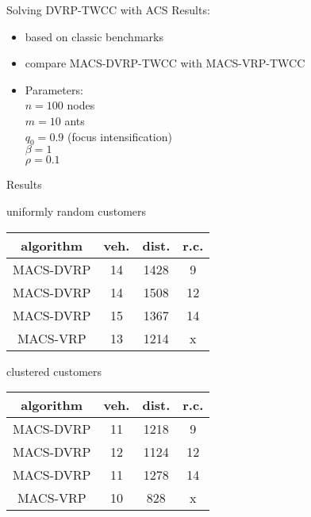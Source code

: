 \begin{frame}{Solving DVRP-TWCC with ACS}
  Results:
  \begin{itemize}
    \item based on classic benchmarks
    \item compare MACS-DVRP-TWCC with MACS-VRP-TWCC
    \item Parameters: \\
	  $n=100$ nodes\\
	  $m=10$ ants\\
	  $q_0=0.9$ (focus intensification)\\
	  $\beta = 1$\\
	  $\rho = 0.1$\\
    
  \end{itemize}
\end{frame}
\begin{frame}{Results}
  \begin{center}

  uniformly random customers\\
  \begin{tabular}{|c|c|c|c|}
    \hline
    algorithm	& veh.	& dist.	& r.c.	\\
    \hline
    MACS-DVRP	& 14	& 1428	& 9	\\
    MACS-DVRP	& 14	& 1508	& 12	\\
    MACS-DVRP	& 15	& 1367	& 14	\\
    \hline
    MACS-VRP	& 13	& 1214	& x	\\
    \hline
  \end{tabular}
  
  \vspace{15pt}

  clustered customers\\
  \begin{tabular}{|c|c|c|c|}
    \hline
    algorithm	& veh.	& dist.	& r.c.	\\
    \hline
    MACS-DVRP	& 11	& 1218	& 9	\\
    MACS-DVRP	& 12	& 1124	& 12	\\
    MACS-DVRP	& 11	& 1278	& 14	\\
    \hline
    MACS-VRP	& 10	& 828	& x	\\
    \hline
  \end{tabular}
  \end{center}

\end{frame}

